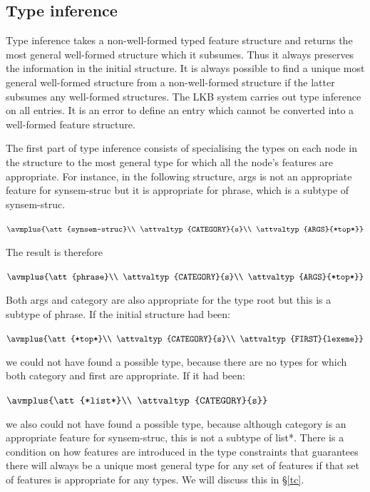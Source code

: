 \documentclass[12pt]{report}
\begin{document}
\subsection{Type inference}

Type inference takes a non-well-formed
typed feature structure and returns the most general
well-formed structure which it subsumes.  Thus
it always preserves the information in the initial structure.
It is always possible to find a unique most general
well-formed structure from a non-well-formed structure
if the latter subsumes any well-formed structures.
The LKB system carries
out type inference on all entries.  It is an error to
define an entry which cannot be converted into a well-formed 
feature structure.  

The first part of type inference consists of specialising
the types on each node in the structure to the most general
type for which all the node's features are appropriate.
For instance, in the following structure,
{\feature args} is not an appropriate feature for {\type synsem-struc}
but it is appropriate for {\type phrase}, which is a subtype of 
{\type synsem-struc}.  
\begin{ex}
{\tiny $\avmplus{\att{synsem-struc}\\
\attvaltyp{CATEGORY}{s}\\
\attvaltyp{ARGS}{*top*}}$}
\end{ex}
The result is therefore
\begin{ex}
{\tiny $\avmplus{\att{phrase}\\
\attvaltyp{CATEGORY}{s}\\
\attvaltyp{ARGS}{*top*}}$}
\end{ex}
Both {\feature args} and {\feature category} 
are also appropriate for the type {\type root}
but this is a subtype of {\type phrase}.
If the initial structure had been:
\begin{ex}
{\tiny $\avmplus{\att{*top*}\\
\attvaltyp{CATEGORY}{s}\\
\attvaltyp{FIRST}{lexeme}}$}
\end{ex}
we could not have found a possible type, because there are
no types for which both {\feature category} and 
{\feature first} are appropriate.
If it had been:
\begin{ex}
{\tiny $\avmplus{\att{*list*}\\
\attvaltyp{CATEGORY}{s}}$}
\end{ex}
we also could not have found a possible type, because
although {\feature category} 
is an appropriate feature for {\type synsem-struc},
this is not a subtype of {\type *list*}.
There is a condition on
how features are introduced in the type constraints
that guarantees there will always be a unique most general
type for any set of features if that set of features is appropriate
for any types.
We will discuss this in \S\ref{tc}. 
\end{document}
